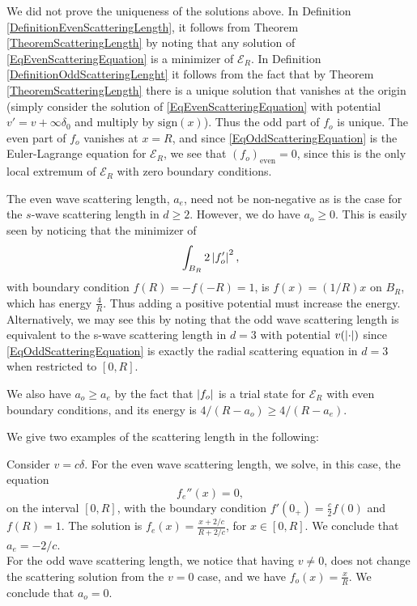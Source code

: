 \begin{remark}
	We did not prove the uniqueness of the solutions above. In Definition \ref{DefinitionEvenScatteringLength}, it follows from Theorem \ref{TheoremScatteringLength} by noting that any solution of \eqref{EqEvenScatteringEquation} is a minimizer of $ \mathcal{E}_R $. In Definition \ref{DefinitionOddScatteringLenght} it follows from the fact that by Theorem \ref{TheoremScatteringLength} there is a unique solution that vanishes at the origin (simply consider the solution of \eqref{EqEvenScatteringEquation} with potential $ v'=v+\infty \delta_0 $ and multiply by $ \text{sign}(x) $). Thus the odd part of $ f_o $ is unique. The even part of $ f_o $ vanishes at $ x=R $, and since \eqref{EqOddScatteringEquation} is the Euler-Lagrange equation for $ \mathcal{E}_R $, we see that $ (f_o)_{\text{even}}=0 $, since this is the only local extremum of $ \mathcal{E}_R $ with zero boundary conditions.
\end{remark}
\begin{remark}
	The even wave scattering length, $ a_e $, need not be non-negative as is the case for the $ s $-wave scattering length in $ d\geq 2 $. However, we do have $ a_o\geq 0 $. This is easily seen by noticing that the minimizer of \begin{equation}
	\int_{B_R} 2\left\lvert f_o' \right\rvert^2,
	\end{equation}
	with boundary condition $ f(R)=-f(-R)=1 $, is $ f(x)=(1/R) x $ on $ B_R $, which has energy $ \frac{4}{R} $. Thus adding a positive potential must increase the energy. \\
	Alternatively, we may see this by noting that the odd wave scattering length is equivalent to the s-wave scattering length in $ d=3 $ with potential $ v(\left\lvert \cdot \right\rvert) $ since 
	\eqref{EqOddScatteringEquation} is exactly the radial scattering equation in $ d=3 $ when restricted to $ [0,R] $.
\end{remark}
\begin{remark}
	We also have $ a_o\geq a_e $ by the fact that $ \left\lvert f_o \right\rvert $ is a trial state for $ \mathcal{E}_R $ with even boundary conditions, and its energy is $ 4/(R-a_o)\geq 4/(R-a_e) $.
\end{remark}
We give two examples of the scattering length in the following:
\begin{example}\label{ExampleScatteringLengthDelta}
	Consider $ v=c\delta $. For the even wave scattering length, we solve, in this case, the equation \begin{equation}
	f_e''(x)=0,
	\end{equation}
	on the interval $ [0,R] $, with the boundary condition $ f'(0_+)=\frac{c}{2}f(0) $ and $ f(R)=1 $.
	The solution is $ f_e(x)=\frac{x+2/c}{R+2/c} $, for $ x\in[0,R] $. We conclude that $ a_e=-2/c $.\\
	For the odd wave scattering length, we notice that having $ v\neq 0 $, does not change the scattering solution from the $ v=0 $ case, and we have $ f_o(x)=\frac{x}{R} $. We conclude that $ a_o=0 $.
\end{example}
